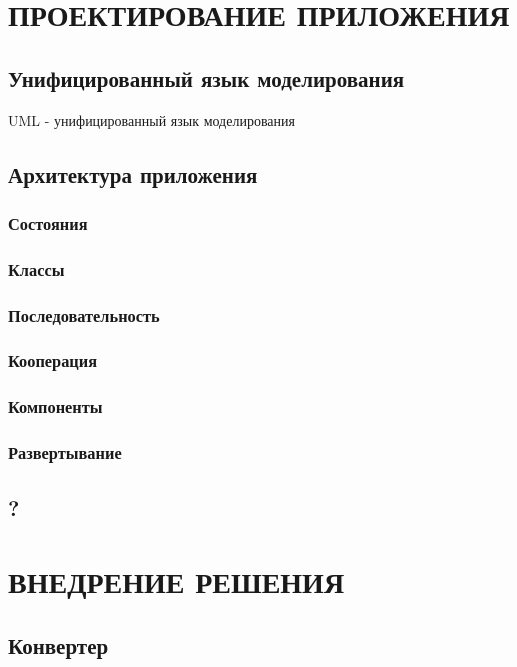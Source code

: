 \newpage
\chapter{ПРОЕКТИРОВАНИЕ ПРИЛОЖЕНИЯ}
\section*{Унифицированный язык моделирования}
UML - унифицированный язык моделирования
\section{Архитектура приложения}
\subsection{Состояния}

\subsection{Классы}

\subsection{Последовательность}

\subsection{Кооперация}

\subsection{Компоненты}

\subsection{Развертывание}

\section{?}

\newpage
\chapter{ВНЕДРЕНИЕ РЕШЕНИЯ}
\section{Конвертер}

